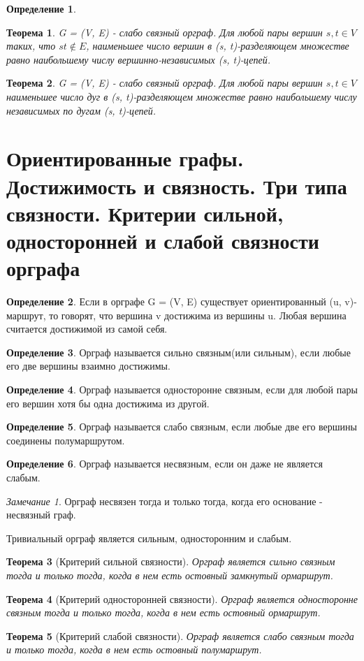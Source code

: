 \documentclass[a4paper]{article}
\newtheorem{theorem}{Теорема}[section]
\theoremstyle{definition}
\newtheorem*{definition}{Определение}
\theoremstyle{remark}
\newtheorem*{remark}{Замечание}
\begin{document}
\begin{multicols*}{2}
\begin{definition}
    \end{definition}
    \begin{theorem}
        G = (V, E) - слабо связный орграф. Для любой пары вершин $s, t \in V$ таких, что $st\notin E$, наименьшее число вершин в (s, t)-разделяющем множестве равно наибольшему числу вершинно-независимых (s, t)-цепей.
    \end{theorem}
    \begin{theorem}
        G = (V, E) - слабо связный орграф. Для любой пары вершин $s, t \in V$ наименьшее число дуг в (s, t)-разделяющем множестве равно наибольшему числу независимых по дугам  (s, t)-цепей.
    \end{theorem}
    \section{Ориентированные графы. Достижимость и связность. Три типа связности. Критерии 
    сильной, односторонней и слабой связности орграфа}
    \begin{definition}
        Если в орграфе G = (V, E) существует ориентированный (u, v)-маршрут, то говорят, что вершина v достижима из вершины u. Любая вершина считается достижимой из самой себя.
    \end{definition}
    \begin{definition}
        Орграф называется сильно связным(или сильным), если любые его две вершины взаимно достижимы.
    \end{definition}
    \begin{definition}
        Орграф называется односторонне связным, если для любой пары его вершин хотя бы одна достижима из другой.
    \end{definition}
    \begin{definition}
        Орграф называется слабо связным, если любые две его вершины соединены полумаршрутом.
    \end{definition}
    \begin{definition}
        Орграф называется несвязным, если он даже не является слабым.
    \end{definition}
    \begin{remark}
        Орграф несвязен тогда и только тогда, когда его основание - несвязный граф.
    \end{remark}
    Тривиальный орграф является сильным, односторонним и слабым.
    \begin{theorem}[Критерий сильной связности]
        Орграф является сильно связным тогда и только тогда, когда в нем есть остовный замкнутый ормаршрут.
    \end{theorem}
    \begin{theorem}[Критерий односторонней связности]
        Орграф является односторонне связным тогда и только тогда, когда в нем есть остовный ормаршрут.
    \end{theorem}
    \begin{theorem}[Критерий слабой связности]
        Орграф является слабо связным тогда и только тогда, когда в нем есть остовный полумаршрут.
    \end{theorem}

\end{multicols*}
\end{document}
